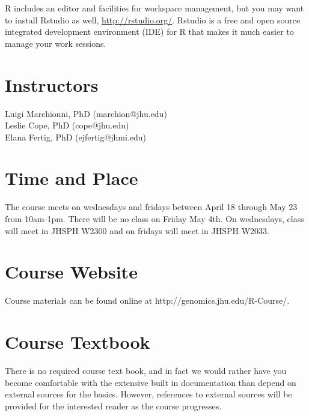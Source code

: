 \documentclass{article}
\begin{document}
R includes an editor and facilities for workspace management, but you may want to install Rstudio as well, \url{http://rstudio.org/}.  Rstudio is a free and open source integrated development environment (IDE) for R that makes it much easier to manage your work sessions. 
\pagebreak

\section*{Instructors}
Luigi Marchionni, PhD (marchion@jhu.edu)\\
Leslie Cope, PhD (cope@jhu.edu)\\
Elana Fertig, PhD (ejfertig@jhmi.edu)



\section*{Time and Place}
\label{classTime}
The course meets on wednesdays and fridays between April 18 through May 23 from 10am-1pm. There will be no class on Friday May 4th.  On wednesdays, class will meet in JHSPH W2300 and on fridays will meet in JHSPH W2033.   

\section*{Course Website} 
Course materials can be found online at http://genomics.jhu.edu/R-Course/.  

\section*{Course Textbook}
There is no required course text book, and in fact we would rather have you become comfortable with the extensive built in documentation than depend on external sources for the basics.  However, references to external sources will be provided for the interested reader as the course progresses.
\end{document}
